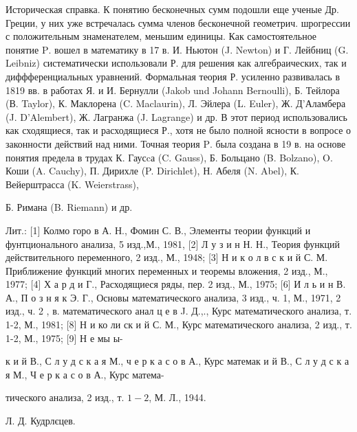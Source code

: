 \documentclass[10pt]{article}
\begin{document}
Историческая справка. К понятию бесконечных сумм подошли еще ученые Др. Греции, у них уже встречалась сумма членов бесконечной геометрич. шрогрессии с положительным знаменателем, меньшим единицы. Как самостоятельное понятие $\mathrm{P}$. вошел в математику в 17 в. И. Ньютон (J. Newton) и Г. Лейбниц (G. Leibniz) систематически использовали Р. для решения как алгебраических, так и диффференциальных уравнений. Формальная теория Р. усиленно развивалась в 1819 вв. в работах Я. и И. Бернулли (Jakob und Johann Bernoulli), Б. Тейлора (В. Taylor), К. Маклорена (C. Maclaurin), Л. Эйлера (L. Euler), Ж. Д'Аламбера (J. D'Alembert), Ж. Лагранжа (J. Lagrange) и др. В этот период использовались как сходящиеся, так и расходящиеся Р., хотя не было полной ясности в вопросе о законности действий над ними. Точная теория $\mathrm{P}$. была создана в 19 в. на основе понятия предела в трудах К. Гаусcа (C. Gauss), Б. Больцано (B. Bolzano), O. Коши (A. Cauchy), П. Дирихле (P. Dirichlet), Н. Абеля (N. Abel), К. Вейерштрасса (K. Weierstrass),



Б. Римана (B. Riemann) и др.



Лит.: [1] Колмо горо в А. Н., Фомин С. В., Элементы теории функций и фунтционального анализа, 5 изд.,М., 1981, [2] Л у з и н Н. Н., Теория функций действительного переменного, 2 изд., М., 1948; [3] Н и к о л в с к и й С. М. Приближение функций многих переменных и теоремы вложения, 2 изд., М., 1977; [4] Х а р д и Г., Расходящиеся ряды, пер. 2 изд., М., 1975; [6] И л ь и н В. А., П о з н я к Э. Г., Основы математического анализа, 3 изд., ч. 1, М., 1971, 2 изд., ч. 2 , в. математического анал ц е в J. Д.,., Курс математического анализа, т. 1-2, М., 1981; [8] Н и ко ли ск и й С. М., Курс математического анализа, 2 изд., т. 1-2, М., 1975; [9] Н е мы ы-

к и й В., С л у д с к а я М., ч е р к а с о в А., Курс матемак и й В., С л у д с к а я М., Ч е р к а с о в А., Курс матема-

тического анализа, 2 изд., т. $1-2$, М. Л., 1944.

Л. Д. Кудрлєцев.
\end{document}
